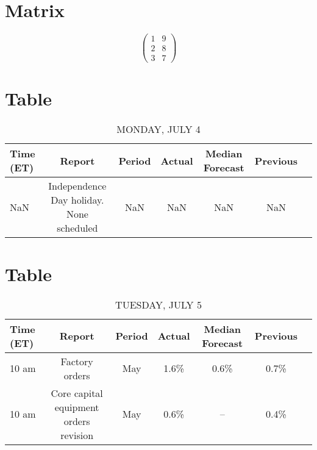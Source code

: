 \documentclass{article}%
\begin{document}
%
\normalsize%
\section{Matrix}%
\label{sec:Matrix}%
\[%
\begin{pmatrix}%
1&9\\%
2&8\\%
3&7%
\end{pmatrix}%
\]

%
\section{Table}%
\label{sec:Table}%


\begin{table}[htbp]%
\caption{MONDAY, JULY 4}%
\centering%
\begin{adjustbox}{width=1\textwidth}%
\begin{tabular}{lcccccc}
\toprule
Time (ET) &                                   Report & Period & Actual & Median Forecast & Previous \\
\midrule
      NaN & Independence Day holiday. None scheduled &    NaN &    NaN &             NaN &      NaN \\
\bottomrule
\end{tabular}
%
\end{adjustbox}%
\end{table}

%
\section{Table}%
\label{sec:Table}%


\begin{table}[htbp]%
\caption{TUESDAY, JULY 5}%
\centering%
\begin{adjustbox}{width=1\textwidth}%
\begin{tabular}{lcccccc}
\toprule
Time (ET) &                                 Report & Period & Actual & Median Forecast & Previous \\
\midrule
    10 am &                         Factory orders &    May &   1.6\% &            0.6\% &     0.7\% \\
    10 am & Core capital equipment orders revision &    May &   0.6\% &              -- &     0.4\% \\
\bottomrule
\end{tabular}
%
\end{adjustbox}%
\end{table}
\end{document}
